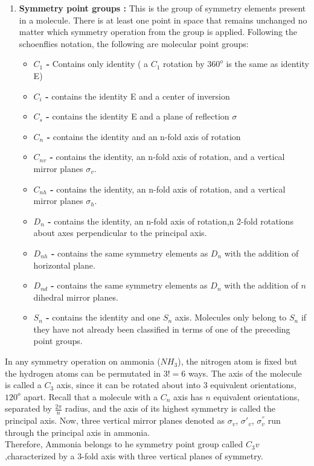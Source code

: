 \documentclass[a4paper, 12pt, openany]{report}
\begin{document}
\begin{enumerate}
\begin{itemize}
		\end{itemize}
	\item\textbf{Symmetry point groups :} This is the group of symmetry elements present in a molecule. There is at least one point in space that remains unchanged no matter which symmetry operation from the group is applied. Following the schoenflies notation, the following are molecular point groups: \begin{itemize}
		\item \textbf{$C_1$ -} Contains only identity ( a $C_1$ rotation by $360^o$ is the same as identity E)
		\item \textbf{$C_i$ -} contains the identity E and a center of inversion
		\item \textbf{$C_s$ -} contains the identity E and a plane of reflection $\sigma$
       	\item \textbf{$C_n$ -} contains the identity and an n-fold axis of rotation
       	\item \textbf{$C_{nv}$ -} contains the identity, an n-fold axis of rotation, and a vertical mirror planes $\sigma_v$.	
       	\item \textbf{$C_{nh}$ -} contains the identity, an n-fold axis of rotation, and a vertical mirror planes $\sigma_h$.
       	\item \textbf{$D_n$ -} contains the identity, an n-fold axis of \break rotation,n 2-fold rotations about axes perpendicular to the \break principal axis.
       	\item \textbf{$D_{nh}$ -} contains the same symmetry elements as $D_n$  with the \break addition of horizontal plane.
       	\item \textbf{$D_{nd}$ -} contains the same symmetry elements as $D_n$ with the \break addition of $n$ dihedral mirror planes.
       	\item \textbf{$S_n$ -} contains the identity and one $S_n$ axis. Molecules only belong to $S_n$  if they have not already been classified in terms of one of the preceding point groups.
	\end{itemize}
	\end{enumerate}
In any symmetry operation on ammonia ($NH_3$), the nitrogen atom is fixed but the hydrogen atoms can be permutated in $3!=6$ ways. The axis of the molecule is called a $C_3$ axis, since it can be rotated about into $3$ equivalent \break orientations, $120^o$ apart. Recall that a molecule with a $C_n$ axis has $n$ \break equivalent orientations, separated by $\frac{2\pi}{n}$ radius, and the axis of its \break highest symmetry is called the principal axis. Now, three vertical mirror planes denoted as $\sigma_v$, $\sigma'_v$, $\sigma_v^{''}$ run through the  principal axis in ammonia.\\ Therefore, Ammonia belongs to he symmetry point group called $C_3v$,\break  characterized by a 3-fold axis with three vertical planes of symmetry.
    
\end{document}
